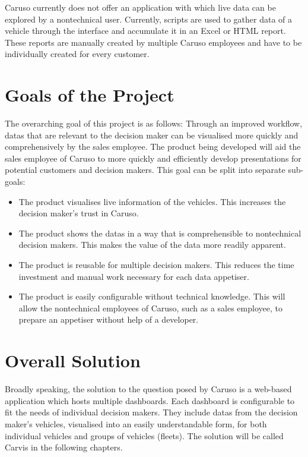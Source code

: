 Caruso currently does not offer an application with which live data can be explored by a \gls{nontechnical} user. Currently, scripts are used to gather data of a vehicle through the interface and accumulate it in an Excel or HTML report. These reports are manually created by multiple Caruso employees and have to be individually created for every customer.

\section{Goals of the Project}
The overarching goal of this project is as follows: Through an improved workflow, \glspl{data} that are relevant to the decision maker can be visualised more quickly and comprehensively by the sales employee. The product being developed will aid the sales employee of Caruso to more quickly and efficiently develop presentations for potential customers and decision makers. This goal can be split into separate sub-goals: 
\begin{itemize}
  \item The product visualises live information of the vehicles. This increases the decision maker's trust in Caruso.
  \item The product shows the \glspl{data} in a way that is comprehensible to \gls{nontechnical} decision makers. This makes the value of the data more readily apparent.
  \item The product is reusable for multiple decision makers. This reduces the time investment and manual work necessary for each data \gls{appetiser}.
  \item The product is easily configurable without technical knowledge. This will allow the \gls{nontechnical} employees of Caruso, such as a sales employee, to prepare an \gls{appetiser} without help of a developer.
\end{itemize}

\section{Overall Solution}
Broadly speaking, the solution to the question posed by Caruso is a web-based application which hosts multiple dashboards. Each dashboard is configurable to fit the needs of individual decision makers. They include \glspl{data} from the decision maker's vehicles, visualised into an easily understandable form, for both individual vehicles and groups of vehicles (fleets). The solution will be called Carvis in the following chapters.